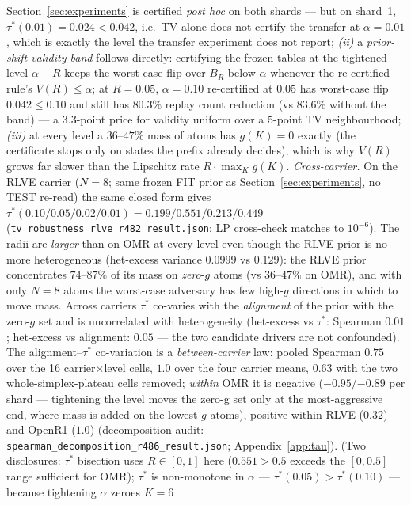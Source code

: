 \documentclass{article}
\theoremstyle{definition}
\theoremstyle{remark}
\begin{document}
Section~\ref{sec:experiments} is certified \emph{post hoc} on both shards
--- but on shard~1, $\tau^*(0.01)=0.024<0.042$, i.e.\ TV alone does not
certify the transfer at $\alpha=0.01$, which is exactly the level the
transfer experiment does not report; \emph{(ii)} a \emph{prior-shift validity
band} follows directly: certifying the frozen tables at the tightened level
$\alpha-R$ keeps the worst-case flip over $B_R$ below $\alpha$ whenever the
re-certified rule's $V(R)\le\alpha$; at $R=0.05$, $\alpha=0.10$ re-certified
at $0.05$ has worst-case flip $0.042\le0.10$ and still has $80.3\%$ replay
count reduction (vs $83.6\%$ without the band) --- a $3.3$-point price for validity
uniform over a $5$-point TV neighbourhood; \emph{(iii)} at every level a $36$--$47\%$ mass of atoms has
$g(K)=0$ exactly (the certificate stops only on states the prefix already
decides), which is why $V(R)$ grows far slower than the Lipschitz rate
$R\cdot\max_K g(K)$.
\emph{Cross-carrier.} On the RLVE carrier ($N{=}8$; same frozen FIT prior as
Section~\ref{sec:experiments}, no TEST re-read) the same closed form gives
$\tau^*(0.10/0.05/0.02/0.01)=0.199/0.551/0.213/0.449$
(\texttt{tv\_robustness\_rlve\_r482\_result.json}; LP cross-check matches to
$10^{-6}$). The radii are \emph{larger} than on OMR at every level even
though the RLVE prior is no more heterogeneous (het-excess variance
$0.0999$ vs $0.129$): the RLVE prior concentrates $74$--$87\%$ of its mass
on \emph{zero}-$g$ atoms (vs $36$--$47\%$ on OMR), and with only $N{=}8$
atoms the worst-case adversary has few high-$g$ directions in which to
move mass. Across carriers $\tau^*$ co-varies with the \emph{alignment} of
the prior with the zero-$g$ set and is uncorrelated with heterogeneity
(het-excess vs $\tau^*$: Spearman $0.01$; het-excess vs alignment: $0.05$
--- the two candidate drivers are not confounded). The
alignment--$\tau^*$ co-variation is a \emph{between-carrier} law: pooled
Spearman $0.75$ over the 16 carrier$\times$level cells, $1.0$ over the
four carrier means, $0.63$ with the two whole-simplex-plateau cells
removed; \emph{within} OMR it is negative ($-0.95$/$-0.89$ per shard ---
tightening the level moves the zero-g set only at the most-aggressive
end, where mass is added on the lowest-$g$ atoms), positive within RLVE
($0.32$) and OpenR1 ($1.0$) (decomposition audit:
\texttt{spearman\_decomposition\_r486\_result.json};
Appendix~\ref{app:tau}). (Two disclosures: $\tau^*$
bisection uses $R\in[0,1]$ here ($0.551>0.5$ exceeds the $[0,0.5]$ range
sufficient for OMR); $\tau^*$ is non-monotone in $\alpha$ ---
$\tau^*(0.05)>\tau^*(0.10)$ --- because tightening $\alpha$ zeroes $K{=}6$
\end{document}
